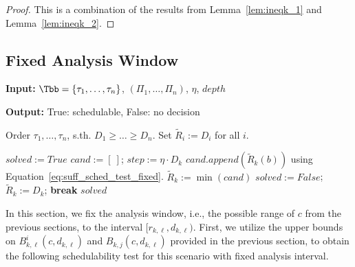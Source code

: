 \documentclass[conference]{IEEEtran}
\theoremstyle{definition}
\theoremstyle{remark}
\newcommand{\Rtilde}{\widetilde{R}}
\begin{document}
	\begin{proof}
		This is a combination of the results from Lemma~\ref{lem:ineqk_1} and Lemma~\ref{lem:ineqk_2}.
	\end{proof}

	\subsection{Fixed Analysis Window}
\label{sec:test_fixed}	
	\begin{algorithm}[t]
		\small
		\caption{Schedulability test with fixed analysis window.}
		\label{alg:sched_test_fixed}
		\begin{algorithmic}[1]
			\item[] \textbf{Input:} $\Tbb = \{\tau_1,\dots,\tau_n\}$, $(\Pi_1,\dots,\Pi_n)$, $\eta$, $depth$
			\item[] \textbf{Output:} True: schedulable, False: no decision
			\item[]
			
			\State Order $\tau_1 ,\dots,\tau_n$, s.th. $D_1\geq \dots \geq D_n$.
			\State Set $\Rtilde_i := D_i$ for all $i$.
			
			\State $solved := True$
			\State $cand := [~]$; $step := \eta \cdot {D_k}$
			\State $cand.append(\Rtilde_k(b))$ using Equation~\eqref{eq:suff_sched_test_fixed}.
			\EndFor
			\State $\Rtilde_k := \min\limits (cand)$
			\If{$\Rtilde_k>D_k$} 
			\State $solved := False$; $\Rtilde_k := D_k$; \textbf{break}
			\EndIf
			\EndFor
			\EndFor
			\State \Return $solved$
		\end{algorithmic}
	\end{algorithm}
	
	In this section, we fix the analysis window, i.e., the possible range of $c$ from the previous sections, to the interval $[r_{k,\ell}, d_{k,\ell})$.
	First, we utilize the upper bounds on $B^i_{k,\ell}(c,d_{k,\ell})$ and $B_{k,j}(c,d_{k,\ell})$ provided in the previous section, to obtain the following schedulability test for this scenario with fixed analysis interval.
	
\end{document}
